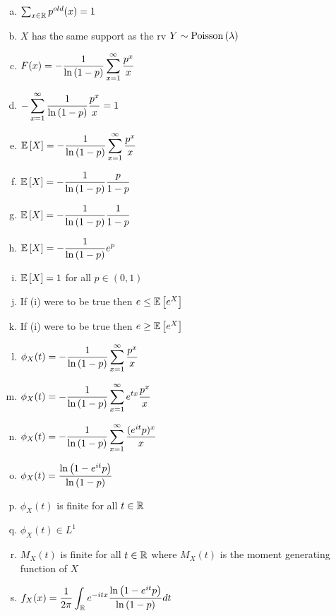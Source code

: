 \documentclass[12pt,landscape]{article}
\begin{document}
\vspace{-0.2cm}\benum{} 
\vspace{-0.2cm}
\begin{multicols}{2}
\begin{enumerate}[(a)]
\item $\sum_{x \in \mathbb{R}} p^{old}(x) = 1$
\item $X$ has the same support as the rv $Y \sim \mathrm{Poisson}\left(\lambda\right)$
\item $F(x) = -\displaystyle\frac{1}{\ln\left(1-p\right)}\sum_{x = 1}^\infty  \frac{p^x}{x}$
\item $-\displaystyle\sum_{x = 1}^\infty  \frac{1}{\ln\left(1-p\right)}\frac{p^x}{x} = 1$
\item $\mathbb{E}\left[X\right] = -\displaystyle\frac{1}{\ln\left(1-p\right)}\sum_{x = 1}^\infty  \frac{p^x}{x}$
\item $\mathbb{E}\left[X\right] = -\displaystyle\frac{1}{\ln\left(1-p\right)}\frac{p}{1-p}$
\item $\mathbb{E}\left[X\right] = -\displaystyle\frac{1}{\ln\left(1-p\right)}\frac{1}{1-p}$
\item $\mathbb{E}\left[X\right] = -\displaystyle\frac{1}{\ln\left(1-p\right)}e^p$
\item $\mathbb{E}\left[X\right] = 1$ for all $p \in (0,1)$

\item If (i) were to be true then $e \leq \mathbb{E}\left[e^X\right]$
\item If (i) were to be true then $e \geq \mathbb{E}\left[e^X\right]$

\item $\phi_X(t) = -\displaystyle\frac{1}{\ln\left(1-p\right)}\sum_{x = 1}^\infty  \frac{p^x}{x}$
\item $\phi_X(t) = -\displaystyle\frac{1}{\ln\left(1-p\right)}\sum_{x = 1}^\infty  e^{tx}\frac{p^x}{x}$
\item $\phi_X(t) = -\displaystyle\frac{1}{\ln\left(1-p\right)}\sum_{x = 1}^\infty  \frac{(e^{it}p)^x}{x}$
\item $\phi_X(t) = \displaystyle\frac{\ln\left(1-e^{it}p\right)}{\ln\left(1-p\right)}$

\item $\phi_X(t)$ is finite for all $t \in \mathbb{R}$ 
\item $\phi_X(t) \in L^1$
\item $M_X(t)$ is finite for all $t \in \mathbb{R}$ where $M_X(t)$ is the moment generating function of $X$
\item $f_X(x) = \displaystyle\frac{1}{2\pi} \int_{\mathbb{R}} e^{-itx} \frac{\ln\left(1-e^{it}p\right)}{\ln\left(1-p\right)} dt$ \\


\end{enumerate}
\end{multicols}
\end{document}
